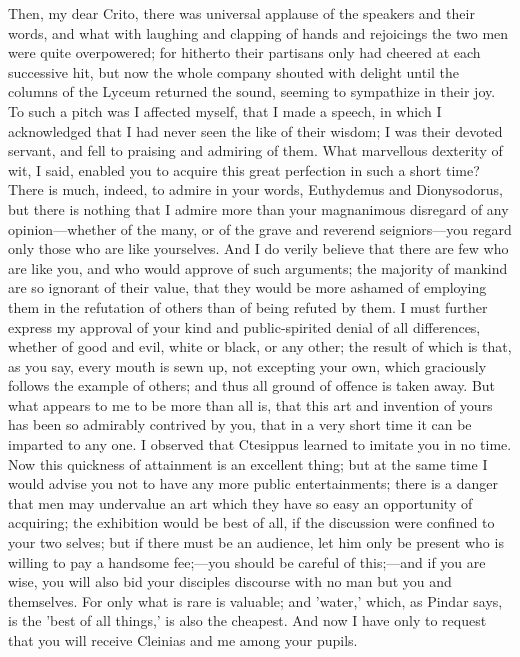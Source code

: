 \documentclass[11pt,letter]{article}
\begin{document}
\par  Then, my dear Crito, there was universal applause of the speakers and their words, and what with laughing and clapping of hands and rejoicings the two men were quite overpowered; for hitherto their partisans only had cheered at each successive hit, but now the whole company shouted with delight until the columns of the Lyceum returned the sound, seeming to sympathize in their joy. To such a pitch was I affected myself, that I made a speech, in which I acknowledged that I had never seen the like of their wisdom; I was their devoted servant, and fell to praising and admiring of them. What marvellous dexterity of wit, I said, enabled you to acquire this great perfection in such a short time? There is much, indeed, to admire in your words, Euthydemus and Dionysodorus, but there is nothing that I admire more than your magnanimous disregard of any opinion—whether of the many, or of the grave and reverend seigniors—you regard only those who are like yourselves. And I do verily believe that there are few who are like you, and who would approve of such arguments; the majority of mankind are so ignorant of their value, that they would be more ashamed of employing them in the refutation of others than of being refuted by them. I must further express my approval of your kind and public-spirited denial of all differences, whether of good and evil, white or black, or any other; the result of which is that, as you say, every mouth is sewn up, not excepting your own, which graciously follows the example of others; and thus all ground of offence is taken away. But what appears to me to be more than all is, that this art and invention of yours has been so admirably contrived by you, that in a very short time it can be imparted to any one. I observed that Ctesippus learned to imitate you in no time. Now this quickness of attainment is an excellent thing; but at the same time I would advise you not to have any more public entertainments; there is a danger that men may undervalue an art which they have so easy an opportunity of acquiring; the exhibition would be best of all, if the discussion were confined to your two selves; but if there must be an audience, let him only be present who is willing to pay a handsome fee;—you should be careful of this;—and if you are wise, you will also bid your disciples discourse with no man but you and themselves. For only what is rare is valuable; and 'water,' which, as Pindar says, is the 'best of all things,' is also the cheapest. And now I have only to request that you will receive Cleinias and me among your pupils.
\end{document}
